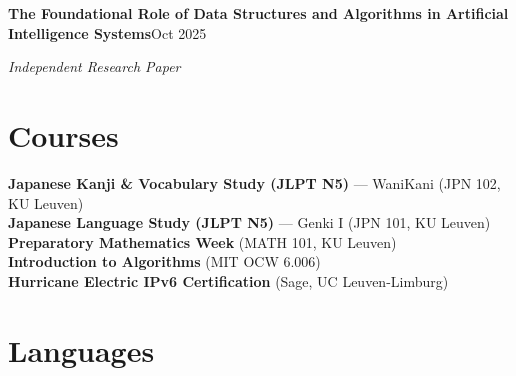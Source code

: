 \vspace{6pt}
{\bodysize\textbf{The Foundational Role of Data Structures and Algorithms in Artificial Intelligence Systems}\hfill{\smallsize\color{subtle}Oct 2025}}\par
\vspace{1pt}
{\bodysize\color{subtle}\textit{Independent Research Paper}}

\section{Courses}

{\bodysize
\textbf{Japanese Kanji \& Vocabulary Study (JLPT N5)} --- WaniKani {\color{subtle}(JPN 102, KU Leuven)}\\[2pt]
\textbf{Japanese Language Study (JLPT N5)} --- Genki I {\color{subtle}(JPN 101, KU Leuven)}\\[2pt]
\textbf{Preparatory Mathematics Week} {\color{subtle}(MATH 101, KU Leuven)}\\[2pt]
\textbf{Introduction to Algorithms} {\color{subtle}(MIT OCW 6.006)}\\[2pt]
\textbf{Hurricane Electric IPv6 Certification} {\color{subtle}(Sage, UC Leuven-Limburg)}
}

\section{Languages}

%
\contactsep%
%
\contactsep%
